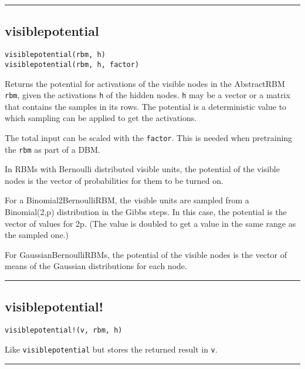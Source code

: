 \noindent\rule{\textwidth}{1pt}
\subsection*{visiblepotential}  \label{bms_visiblepotential}
\begin{verbatim}
visiblepotential(rbm, h)
visiblepotential(rbm, h, factor)
\end{verbatim}
Returns the potential for activations of the visible nodes in the AbstractRBM \texttt{rbm}, given the activations \texttt{h} of the hidden nodes. \texttt{h} may be a vector or a matrix that contains the samples in its rows. The potential is a deterministic value to which sampling can be applied to get the activations.

The total input can be scaled with the \texttt{factor}. This is needed when pretraining the \texttt{rbm} as part of a DBM.

In RBMs with Bernoulli distributed visible units, the potential of the visible nodes is the vector of probabilities for them to be turned on.

For a Binomial2BernoulliRBM, the visible units are sampled from a Binomial(2,p) distribution in the Gibbs steps. In this case, the potential is the vector of values for 2p. (The value is doubled to get a value in the same range as the sampled one.)

For GaussianBernoulliRBMs, the potential of the visible nodes is the vector of means of the Gaussian distributions for each node.

\noindent\rule{\textwidth}{1pt}
\subsection*{visiblepotential!}  \label{bms_visiblepotential!}
\begin{verbatim}
visiblepotential!(v, rbm, h)
\end{verbatim}
Like \texttt{visiblepotential} but stores the returned result in \texttt{v}.

\noindent\rule{\textwidth}{1pt}
